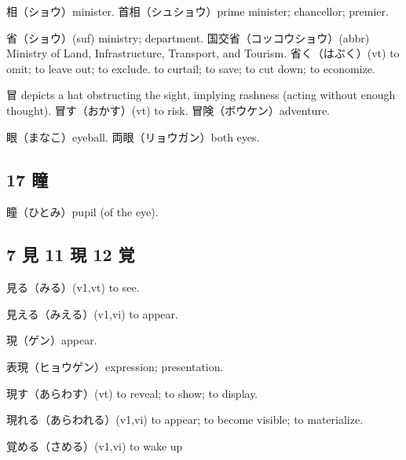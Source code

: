相（ショウ）minister.
首相（シュショウ）prime minister; chancellor; premier.

省（ショウ）(suf) ministry; department.
国交省（コッコウショウ）(abbr)
Ministry of Land, Infrastructure, Transport, and Tourism.
省く（はぶく）(vt)
to omit; to leave out; to exclude.
to curtail; to save; to cut down; to economize.

冒 depicts a hat obstructing the sight, implying rashness
(acting without enough thought).
冒す（おかす）(vt) to risk.
冒険（ボウケン）adventure.

眼（まなこ）eyeball.
両眼（リョウガン）both eyes.

\subsection{17 瞳}

瞳（ひとみ）pupil (of the eye).

\subsection{7 見 11 現 12 覚}

見る（みる）(v1,vt) to see.

見える（みえる）(v1,vi) to appear.

現（ゲン）appear.

表現（ヒョウゲン）expression; presentation.

現す（あらわす）(vt) to reveal; to show; to display.

現れる（あらわれる）(v1,vi) to appear; to become visible; to materialize.

覚める（さめる）(v1,vi) to wake up
